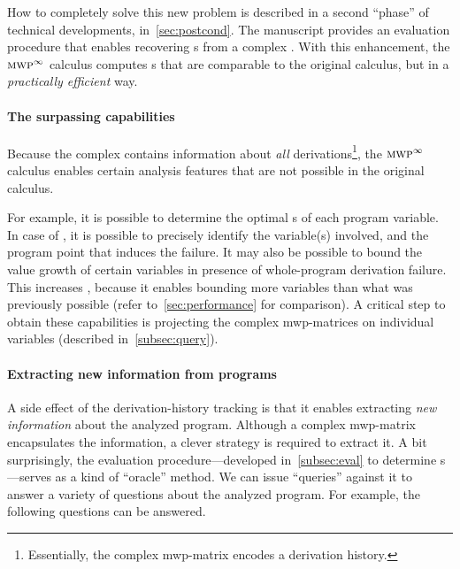 How to completely solve this new problem is described in a second
\enquote{phase} of technical developments, in~\autoref{sec:postcond}. The
manuscript provides an {evaluation procedure} that enables recovering
s from a complex . With this enhancement, the
\(\textnormal{\textsc{mwp}}^\infty\) calculus computes s that are
comparable to the original calculus, but in a \emph{practically efficient} way.

\paragraph*{The surpassing capabilities}
Because the complex  contains information about \emph{all}
derivations\footnote{Essentially, the complex mwp-matrix encodes a derivation
history.}, the \(\textnormal{\textsc{mwp}}^\infty\) calculus enables certain analysis
features that are not possible in the original calculus.

For example, it is possible to determine the optimal s of each
program variable. In case of , it is possible to precisely
identify the variable(s) involved, and the program point that induces the
failure. It may also be possible to bound the value growth of certain variables
in presence of whole-program derivation failure. This increases
, because it enables bounding more variables than what was
previously possible (refer to~\autoref{sec:performance} for comparison). A
critical step to obtain these capabilities is projecting the complex
mwp-matrices on individual variables (described
in~\autoref{subsec:query}).

\paragraph*{Extracting new information from programs}
A side effect of the derivation-history tracking is that it enables extracting
\emph{new information} about the analyzed program. Although a complex mwp-matrix
encapsulates the information, a clever strategy is required to extract it. A bit
surprisingly, the evaluation procedure---developed in~\autoref{subsec:eval} to
determine s---serves as a kind of \enquote{oracle} method. We can
issue \enquote{queries} against it to answer a variety of questions about the
analyzed program. For example, the following questions can be answered.

